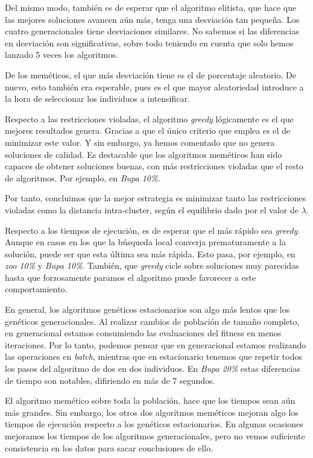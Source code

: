 \documentclass[11pt]{article}
\begin{document}
Del mismo modo, también es de esperar que el algoritmo elitista, que hace que las mejores soluciones avancen aún más, tenga una desviación tan pequeña. Los cuatro generacionales tiene desviaciones similares. No sabemos si las diferencias en desviación son significativas, sobre todo teniendo en cuenta que solo hemos lanzado 5 veces los algoritmos.

De los meméticos, el que más desviación tiene es el de porcentaje aleatorio. De nuevo, esto también era esperable, pues es el que mayor aleatoriedad introduce a la hora de seleccionar los individuos a intensificar.

Respecto a las restricciones violadas, el algoritmo \emph{greedy} lógicamente es el que mejores resultados genera. Gracias a que el único criterio que emplea es el de minimizar este valor. Y sin embargo, ya hemos comentado que no genera soluciones de calidad. Es destacable que los algoritmos meméticos han sido capaces de obtener soluciones buenas, con más restricciones violadas que el resto de algoritmos. Por ejemplo, en \emph{Bupa 10\%}.

Por tanto, concluimos que la mejor estrategia es minimizar tanto las restricciones violadas como la distancia intra-cluster, según el equilibrio dado por el valor de $\lambda$.

Respecto a los tiempos de ejecución, es de esperar que el más rápido sea \emph{greedy}. Aunque en casos en los que la búsqueda local converja prematuramente a la solución, puede ser que esta última sea más rápida. Esto pasa, por ejemplo, en \emph{zoo 10\%} y \emph{Bupa 10\%}. También, que \emph{greedy} cicle sobre soluciones muy parecidas hasta que forzosamente paramos el algoritmo puede favorecer a este comportamiento.

En general, los algoritmos genéticos estacionarios son algo más lentos que los genéticos generacionales. Al realizar cambios de población de tamaño completo, en generacional estamos consumiendo las evaluaciones del fitness en menos iteraciones. Por lo tanto, podemos pensar que en generacional estamos realizando las operaciones en \emph{batch}, mientras que en estacionario tenemos que repetir todos los pasos del algoritmo de dos en dos individuos. En \emph{Bupa 20\%} estas diferencias de tiempo son notables, difiriendo en más de 7 segundos.

El algoritmo memético sobre toda la población, hace que los tiempos sean aún más grandes. Sin embargo, los otros dos algoritmos meméticos mejoran algo los tiempos de ejecución respecto a los genéticos estacionarios. En algunas ocasiones mejoramos los tiempos de los algoritmos generacionales, pero no vemos suficiente consistencia en los datos para sacar conclusiones de ello.
\end{document}
